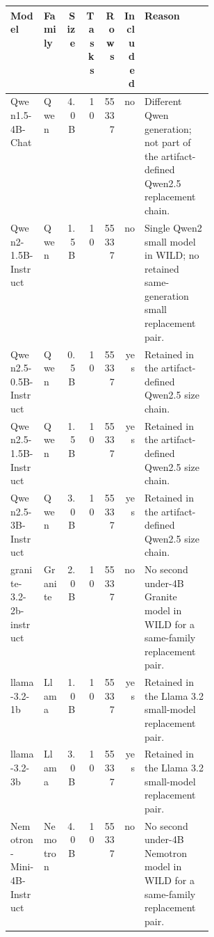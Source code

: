 \begin{tabular}{llrrrrp{0.34\linewidth}}
\toprule
Model & Family & Size & Tasks & Rows & Included & Reason \\
\midrule
Qwen1.5-4B-Chat & Qwen & 4.0B & 10 & 55337 & no & Different Qwen generation; not part of the artifact-defined Qwen2.5 replacement chain. \\
Qwen2-1.5B-Instruct & Qwen & 1.5B & 10 & 55337 & no & Single Qwen2 small model in WILD; no retained same-generation small replacement pair. \\
Qwen2.5-0.5B-Instruct & Qwen & 0.5B & 10 & 55337 & yes & Retained in the artifact-defined Qwen2.5 size chain. \\
Qwen2.5-1.5B-Instruct & Qwen & 1.5B & 10 & 55337 & yes & Retained in the artifact-defined Qwen2.5 size chain. \\
Qwen2.5-3B-Instruct & Qwen & 3.0B & 10 & 55337 & yes & Retained in the artifact-defined Qwen2.5 size chain. \\
granite-3.2-2b-instruct & Granite & 2.0B & 10 & 55337 & no & No second under-4B Granite model in WILD for a same-family replacement pair. \\
llama-3.2-1b & Llama & 1.0B & 10 & 55337 & yes & Retained in the Llama 3.2 small-model replacement pair. \\
llama-3.2-3b & Llama & 3.0B & 10 & 55337 & yes & Retained in the Llama 3.2 small-model replacement pair. \\
Nemotron-Mini-4B-Instruct & Nemotron & 4.0B & 10 & 55337 & no & No second under-4B Nemotron model in WILD for a same-family replacement pair. \\
\bottomrule
\end{tabular}
